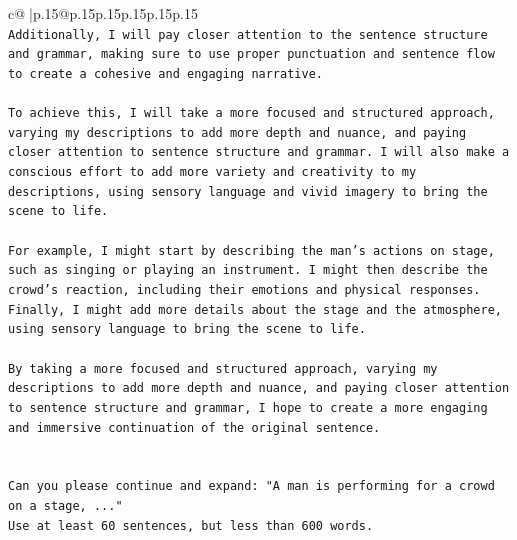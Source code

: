 \documentclass{article}
\begin{document}
{\begin{supertabular}{c@{$\;$}|p{.15\linewidth}@{}p{.15\linewidth}p{.15\linewidth}p{.15\linewidth}p{.15\linewidth}p{.15\linewidth}}
{{{\\ 
\texttt{Additionally, I will pay closer attention to the sentence structure and grammar, making sure to use proper punctuation and sentence flow to create a cohesive and engaging narrative.} \\
\\ 
\texttt{To achieve this, I will take a more focused and structured approach, varying my descriptions to add more depth and nuance, and paying closer attention to sentence structure and grammar. I will also make a conscious effort to add more variety and creativity to my descriptions, using sensory language and vivid imagery to bring the scene to life.} \\
\\ 
\texttt{For example, I might start by describing the man's actions on stage, such as singing or playing an instrument. I might then describe the crowd's reaction, including their emotions and physical responses. Finally, I might add more details about the stage and the atmosphere, using sensory language to bring the scene to life.} \\
\\ 
\texttt{By taking a more focused and structured approach, varying my descriptions to add more depth and nuance, and paying closer attention to sentence structure and grammar, I hope to create a more engaging and immersive continuation of the original sentence.} \\
\\ 
\\ 
\texttt{Can you please continue and expand: "A man is performing for a crowd on a stage, ..."} \\
\texttt{Use at least 60 sentences, but less than 600 words.} \\
            }
        }
    }
     \\ \\


\end{supertabular}}
\end{document}
